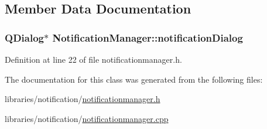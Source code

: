 \subsection{Member Data Documentation}
\hypertarget{class_notification_manager_ae08eff7b1393bf76588b6460d20971bd}{
\subsubsection[{notificationDialog}]{\setlength{\rightskip}{0pt plus 5cm}QDialog$\ast$ {\bf NotificationManager::notificationDialog}}}
\label{class_notification_manager_ae08eff7b1393bf76588b6460d20971bd}


Definition at line 22 of file notificationmanager.h.



The documentation for this class was generated from the following files:\begin{DoxyCompactItemize}
\item 
libraries/notification/\hyperlink{notificationmanager_8h}{notificationmanager.h}\item 
libraries/notification/\hyperlink{notificationmanager_8cpp}{notificationmanager.cpp}\end{DoxyCompactItemize}
